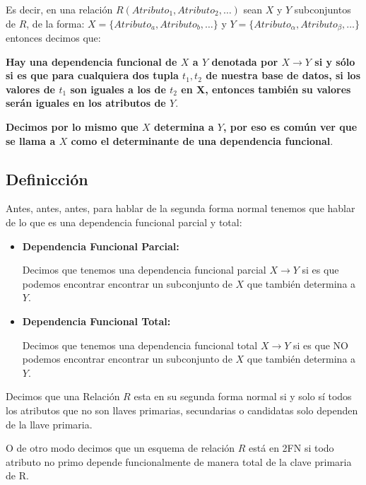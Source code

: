 \documentclass[12pt, fleqn]{report}                             %
\theoremstyle{break}                                            %
\newcommand \lLongTo {\longrightarrow}                          %
\begin{document}
            Es decir, en una relación $R(Atributo_1, Atributo_2, \dots)$ sean $X$ y $Y$ subconjuntos de $R$, de la forma: $X = \{Atributo_a, Atributo_b, \dots\}$ y 
            $Y = \{Atributo_\alpha, Atributo_\beta, \dots\}$ entonces decimos que:

            \textbf{Hay una dependencia funcional de $X$ a $Y$ denotada por $X \lLongTo Y$
            si y sólo si es que para cualquiera dos tupla $t_1, t_2$ de nuestra base de
            datos, si los valores de $t_1$ son iguales a los de $t_2$ en X, entonces
            también su valores serán iguales en los atributos de $Y$}.

            \textbf{Decimos por lo mismo que $X$ determina a $Y$, por eso es común ver que se llama
            a $X$ como el determinante de una dependencia funcional}.


        \subsection{Definicción}

            Antes, antes, antes, para hablar de la segunda forma normal tenemos que 
            hablar de lo que es una dependencia funcional parcial y total:

            \begin{itemize}
                \item \textbf{Dependencia Funcional Parcial:}

                    Decimos que tenemos una dependencia funcional parcial $X \lLongTo Y$
                    si es que podemos encontrar encontrar un subconjunto de $X$ que también
                    determina a $Y$.

                \item \textbf{Dependencia Funcional Total:}

                    Decimos que tenemos una dependencia funcional total $X \lLongTo Y$
                    si es que NO podemos encontrar encontrar un subconjunto de $X$ que también
                    determina a $Y$.
            \end{itemize}

            Decimos que una Relación $R$ esta en su segunda forma normal
            si y solo sí todos los atributos que no son llaves primarias, secundarias
            o candidatas solo dependen de la llave primaria.

            O de otro modo decimos que un esquema de relación $R$ está en 2FN si
            todo atributo no primo depende funcionalmente de manera total de la
            clave primaria de R.
\end{document}
